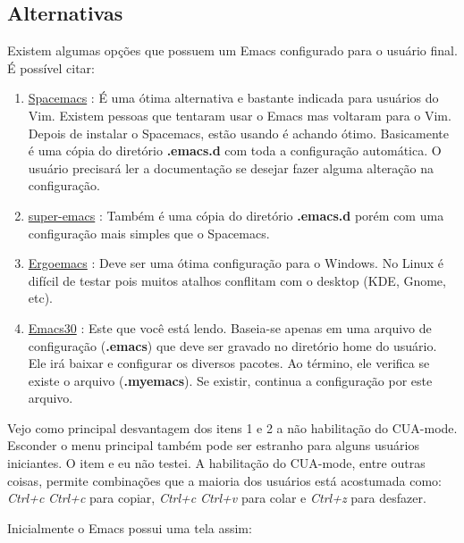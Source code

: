 \documentclass[]{article}
\providecommand{\tightlist}{%
  \setlength{\itemsep}{0pt}\setlength{\parskip}{0pt}}
\begin{document}
\subsection{Alternativas}\label{alternativas}

Existem algumas opções que possuem um Emacs configurado para o usuário
final. É possível citar:

\begin{enumerate}
\tightlist
\item
  \href{https://github.com/syl20bnr/spacemacs}{Spacemacs} : É uma ótima
  alternativa e bastante indicada para usuários do Vim. Existem pessoas
  que tentaram usar o Emacs mas voltaram para o Vim. Depois de instalar
  o Spacemacs, estão usando é achando ótimo. Basicamente é uma cópia do
  diretório \textbf{.emacs.d} com toda a configuração automática. O
  usuário precisará ler a documentação se desejar fazer alguma alteração
  na configuração.
\item
  \href{https://github.com/myTerminal/super-emacs}{super-emacs} : Também
  é uma cópia do diretório \textbf{.emacs.d} porém com uma configuração
  mais simples que o Spacemacs.
\item
  \href{https://github.com/ergoemacs/ergoemacs-mode}{Ergoemacs} : Deve
  ser uma ótima configuração para o Windows. No Linux é difícil de
  testar pois muitos atalhos conflitam com o desktop (KDE, Gnome, etc).
\item
  \href{https://github.com/guaracy/emacs/tree/master/config}{Emacs30} :
  Este que você está lendo. Baseia-se apenas em uma arquivo de
  configuração (\textbf{.emacs}) que deve ser gravado no diretório home
  do usuário. Ele irá baixar e configurar os diversos pacotes. Ao
  término, ele verifica se existe o arquivo (\textbf{.myemacs}). Se
  existir, continua a configuração por este arquivo.
\end{enumerate}

Vejo como principal desvantagem dos itens 1 e 2 a não habilitação do
CUA-mode. Esconder o menu principal também pode ser estranho para alguns
usuários iniciantes. O item e eu não testei. A habilitação do CUA-mode,
entre outras coisas, permite combinações que a maioria dos usuários está
acostumada como: \emph{Ctrl+c} \emph{Ctrl+c} para copiar, \emph{Ctrl+c}
\emph{Ctrl+v} para colar e \emph{Ctrl+z} para desfazer.

Inicialmente o Emacs possui uma tela assim:
\end{document}
